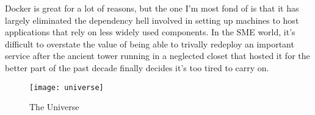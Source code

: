 \documentclass{article}
\begin{document}
Docker is great for a lot of reasons, but the one I'm most fond of is that it has largely eliminated the dependency hell involved in setting up machines to host applications that rely on less widely used components.  In the SME world, it's difficult to overstate the value of being able to trivally redeploy an important service after the ancient tower running in a neglected closet that hosted it for the better part of the past decade finally decides it's too tired to carry on.

\begin{figure}[h!]
\centering
\texttt{[image: universe]}
\caption{The Universe}
\label{fig:universe}
\end{figure}
\end{document}

